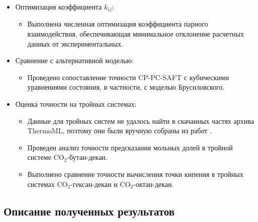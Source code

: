 \documentclass[a4paper,12pt]{article}
\begin{document}
\begin{itemize}
\begin{itemize}
    \end{itemize}
    \item Оптимизация коэффициента \( k_{ij} \):
    \begin{itemize}
        \item Выполнена численная оптимизация коэффициента парного взаимодействия, обеспечивающая минимальное отклонение расчетных данных от экспериментальных.
    \end{itemize}
    \item Сравнение с альтернативной моделью:
    \begin{itemize}
        \item Проведено сопоставление точности CP-PC-SAFT с кубическими уравнениями состояния, в частности, с моделью Брусиловского.
    \end{itemize}
    \item Оценка точности на тройных системах:
    \begin{itemize}
	\item Данные для тройных систем не удалось найти в скачанных частях архива ThermoML, поэтому они были вручную собраны из работ \cite{SanchezGarcia2023, Nagarajan1990}. 
        \item Проведен анализ точности предсказания мольных долей в тройной системе $\mathrm{CO}_{2}$-бутан-декан.
        \item Выполнено сравнение точности вычисления точки кипения в тройных системах $\mathrm{CO}_{2}$-гексан-декан и $\mathrm{CO}_{2}$-октан-декан.
    \end{itemize}

\end{itemize}

\subsection{Описание полученных результатов}
\end{document}
